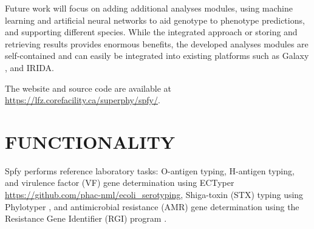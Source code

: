 \documentclass[a4,center,fleqn]{NAR}
\begin{document}
Future work will focus on adding additional analyses modules, using machine learning and artificial neural networks to aid genotype to phenotype predictions, and supporting different species. While the integrated approach or storing and retrieving results provides enormous benefits, the developed analyses modules are self-contained and can easily be integrated into existing platforms such as Galaxy \cite{goecks2010galaxy}, and IRIDA.

The website and source code are available at \url{https://lfz.corefacility.ca/superphy/spfy/}. \par



\enlargethispage{-65.1pt}



\section{FUNCTIONALITY}
Spfy performs reference laboratory tasks: O-antigen typing, H-antigen typing, and virulence factor (VF) gene determination using ECTyper \url{https://github.com/phac-nml/ecoli_serotyping}, Shiga-toxin (STX) typing using Phylotyper \cite{whiteside2017phylotyper}, and antimicrobial resistance (AMR) gene determination using the Resistance Gene Identifier (RGI) program \cite{mcarthur2013comprehensive}.
\end{document}
